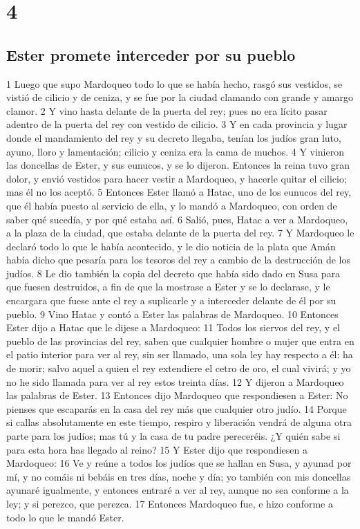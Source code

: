 \chapter{4}

\section*{Ester promete interceder por su pueblo}

1 Luego que supo Mardoqueo todo lo que se había hecho, rasgó sus vestidos, se vistió de cilicio y de ceniza, y se fue por la ciudad clamando con grande y amargo clamor.
2 Y vino hasta delante de la puerta del rey; pues no era lícito pasar adentro de la puerta del rey con vestido de cilicio.
3 Y en cada provincia y lugar donde el mandamiento del rey y su decreto llegaba, tenían los judíos gran luto, ayuno, lloro y lamentación; cilicio y ceniza era la cama de muchos.
4 Y vinieron las doncellas de Ester, y sus eunucos, y se lo dijeron. Entonces la reina tuvo gran dolor, y envió vestidos para hacer vestir a Mardoqueo, y hacerle quitar el cilicio; mas él no los aceptó.
5 Entonces Ester llamó a Hatac, uno de los eunucos del rey, que él había puesto al servicio de ella, y lo mandó a Mardoqueo, con orden de saber qué sucedía, y por qué estaba así.
6 Salió, pues, Hatac a ver a Mardoqueo, a la plaza de la ciudad, que estaba delante de la puerta del rey.
7 Y Mardoqueo le declaró todo lo que le había acontecido, y le dio noticia de la plata que Amán había dicho que pesaría para los tesoros del rey a cambio de la destrucción de los judíos.
8 Le dio también la copia del decreto que había sido dado en Susa para que fuesen destruidos, a fin de que la mostrase a Ester y se lo declarase, y le encargara que fuese ante el rey a suplicarle y a interceder delante de él por su pueblo.
9 Vino Hatac y contó a Ester las palabras de Mardoqueo.
10 Entonces Ester dijo a Hatac que le dijese a Mardoqueo:
11 Todos los siervos del rey, y el pueblo de las provincias del rey, saben que cualquier hombre o mujer que entra en el patio interior para ver al rey, sin ser llamado, una sola ley hay respecto a él: ha de morir; salvo aquel a quien el rey extendiere el cetro de oro, el cual vivirá; y yo no he sido llamada para ver al rey estos treinta días.
12 Y dijeron a Mardoqueo las palabras de Ester.
13 Entonces dijo Mardoqueo que respondiesen a Ester: No pienses que escaparás en la casa del rey más que cualquier otro judío.
14 Porque si callas absolutamente en este tiempo, respiro y liberación vendrá de alguna otra parte para los judíos; mas tú y la casa de tu padre pereceréis. ¿Y quién sabe si para esta hora has llegado al reino?
15 Y Ester dijo que respondiesen a Mardoqueo:
16 Ve y reúne a todos los judíos que se hallan en Susa, y ayunad por mí, y no comáis ni bebáis en tres días, noche y día; yo también con mis doncellas ayunaré igualmente, y entonces entraré a ver al rey, aunque no sea conforme a la ley; y si perezco, que perezca.
17 Entonces Mardoqueo fue, e hizo conforme a todo lo que le mandó Ester.

